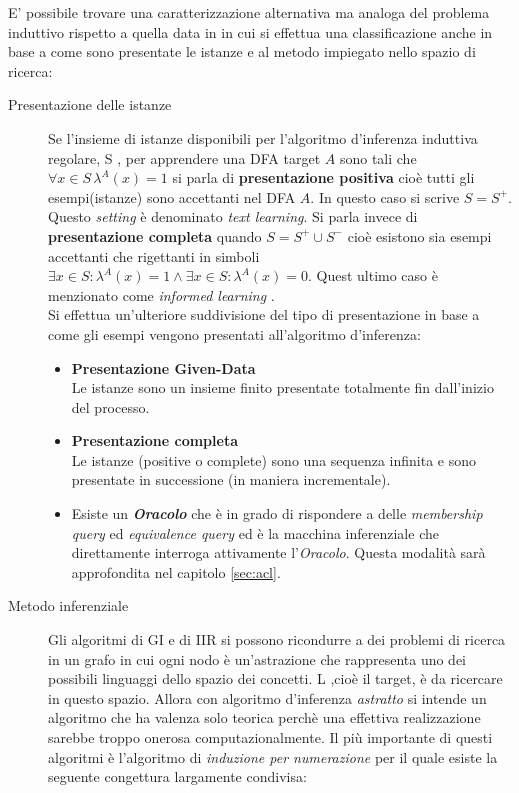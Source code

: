 E' possibile trovare una caratterizzazione alternativa ma analoga del problema induttivo rispetto a quella data in \cite{Angluin83} in cui si effettua una classificazione anche in base a come sono presentate le istanze e al metodo impiegato nello spazio di ricerca:
\begin{description}
\item[Presentazione delle istanze]Se l'insieme di istanze disponibili per l'algoritmo d'inferenza induttiva regolare, S , per apprendere una \ac{DFA}  target $A$ sono tali che $\forall x \in S \,\lambda^{A}(x) = 1$ si parla di \textbf{presentazione positiva} cioè tutti gli esempi(istanze) sono accettanti nel \ac{DFA} $A$. In questo caso si scrive $S=S^{+}$. Questo \textit{setting} è  denominato \textit{text learning}\cite[p. 217]{DeLaHiguera10}. Si parla invece di \textbf{presentazione completa} quando $S=S^{+} \cup S^{-}$ cioè esistono sia esempi accettanti che rigettanti in simboli $\exists x \in S :   \lambda^{A}(x)=1 \land \exists x \in S :   \lambda^{A}(x)=0$. Quest ultimo caso è menzionato come \textit{informed learning} \cite[p. 237]{DeLaHiguera10} .\\

Si effettua un'ulteriore suddivisione del tipo di presentazione in base a come gli esempi vengono presentati all'algoritmo d'inferenza:
\begin{itemize}
\item \textbf{Presentazione Given-Data}\\Le istanze sono un insieme finito presentate totalmente fin dall'inizio del processo.
\item \textbf{Presentazione completa}\\Le istanze (positive o complete) sono una sequenza infinita e sono presentate in successione (in maniera incrementale).  
\item Esiste un \textbf{\textit{Oracolo}} che è in grado di rispondere a delle \textit{membership query} ed \textit{equivalence query} ed è la macchina inferenziale che direttamente interroga attivamente l'\textit{Oracolo}. Questa modalità sarà approfondita nel capitolo \ref{sec:acl}.
\end{itemize}
\item[Metodo inferenziale]Gli algoritmi di \ac{GI} e di \ac{IIR} si possono ricondurre a dei problemi di ricerca in un grafo in cui ogni nodo è un'astrazione che rappresenta uno dei possibili linguaggi dello spazio dei concetti. \ac{L} ,cioè il target, è da ricercare in questo spazio.  Allora con algoritmo d'inferenza \textit{astratto} si intende un algoritmo che ha valenza solo teorica perchè una effettiva realizzazione sarebbe troppo onerosa computazionalmente. Il più importante di questi algoritmi è l'algoritmo di \textit{induzione per numerazione} per il quale esiste la seguente congettura largamente condivisa:


\end{description}
